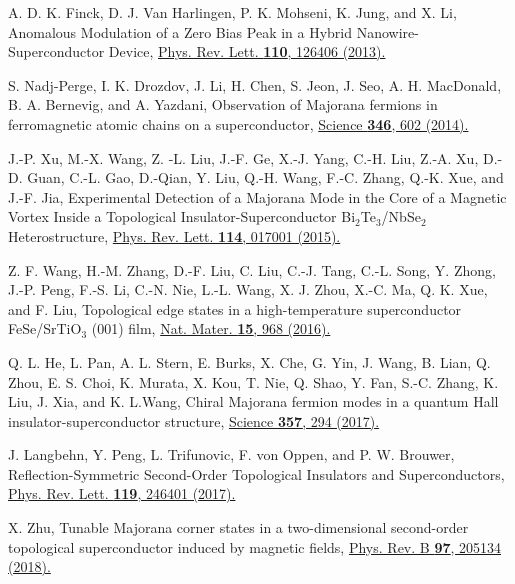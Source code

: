 \documentclass[twocolumn,prl,floatfix,citeautoscript,nofootinbib,superscriptaddress]{revtex4}
\begin{document}
\begin{thebibliography}{99}
 A. D. K. Finck, D. J. Van Harlingen, P. K. Mohseni, K.
Jung, and X. Li, Anomalous Modulation of a Zero Bias Peak in a Hybrid
Nanowire-Superconductor Device, \href{https://doi.org/10.1103/PhysRevLett.110.126406}%
{Phys. Rev. Lett. \textbf{110}, 126406 (2013).}

 S. Nadj-Perge, I. K. Drozdov, J. Li, H. Chen, S. Jeon, J.
Seo, A. H. MacDonald, B. A. Bernevig, and A. Yazdani, Observation of
Majorana fermions in ferromagnetic atomic chains on a superconductor, \href{http://science.sciencemag.org/content/346/6209/602.full}%
{Science \textbf{346}, 602 (2014). }

 J.-P. Xu, M.-X. Wang, Z. -L. Liu, J.-F. Ge, X.-J. Yang,
C.-H. Liu, Z.-A. Xu, D.-D. Guan, C.-L. Gao, D.-Qian, Y. Liu, Q.-H. Wang,
F.-C. Zhang, Q.-K. Xue, and J.-F. Jia, Experimental Detection of a Majorana
Mode in the Core of a Magnetic Vortex Inside a Topological
Insulator-Superconductor \textrm{Bi}$_{2}$\textrm{Te}$_{3}$/\textrm{NbSe}$%
_{2}$ Heterostructure, \href{https://doi.org/10.1103/PhysRevLett.114.017001}{%
Phys. Rev. Lett. \textbf{114}, 017001 (2015).}

 Z. F. Wang, H.-M. Zhang, D.-F. Liu, C. Liu, C.-J. Tang,
C.-L. Song, Y. Zhong, J.-P. Peng, F.-S. Li, C.-N. Nie, L.-L. Wang, X. J.
Zhou, X.-C. Ma, Q. K. Xue, and F. Liu, Topological edge states in a
high-temperature superconductor FeSe/SrTiO$_{3}$ (001) film, \href{https://doi.org/10.1038/nmat4686}%
{Nat. Mater. \textbf{15}, 968 (2016).}

 Q. L. He, L. Pan, A. L. Stern, E. Burks, X. Che, G. Yin,
J. Wang, B. Lian, Q. Zhou, E. S. Choi, K. Murata, X. Kou, T. Nie, Q. Shao,
Y. Fan, S.-C. Zhang, K. Liu, J. Xia, and K. L.Wang, Chiral Majorana fermion
modes in a quantum Hall insulator-superconductor structure, \href{http://science.sciencemag.org/content/357/6348/294}%
{Science \textbf{357}, 294 (2017).}

 J. Langbehn, Y. Peng, L. Trifunovic, F. von Oppen,
and P. W. Brouwer, Reflection-Symmetric Second-Order Topological Insulators
and Superconductors, \href{https://doi.org/10.1103/PhysRevLett.119.246401}{%
Phys. Rev. Lett. \textbf{119}, 246401 (2017).}

 X. Zhu, Tunable Majorana corner states in a
two-dimensional second-order topological superconductor induced by magnetic
fields, \href{https://doi.org/10.1103/PhysRevB.97.205134}{Phys. Rev. B
\textbf{97}, 205134 (2018).}


\end{thebibliography}
\end{document}
